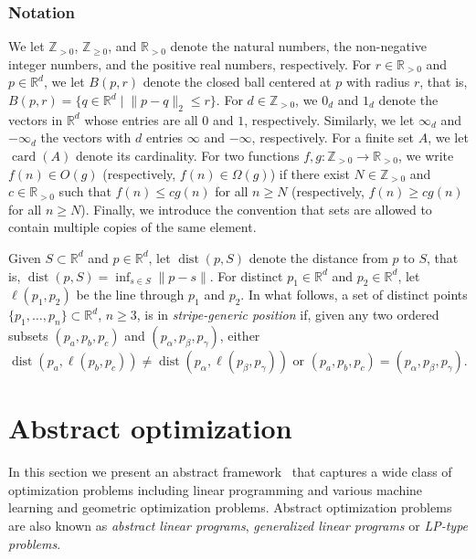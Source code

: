 \documentclass[onecolumn,journal,letterpaper]{IEEEtran}
\renewcommand{\natural}{{\mathbb{N}}}
\newcommand{\integernonnegative}{{\mathbb{Z}_{\geq0}}}
\renewcommand{\natural}{{\mathbb{Z}_{>0}}}
\newcommand{\naturalzero}{\mathbb{N}_0}
\renewcommand{\naturalzero}{\integernonnegative}
\newcommand{\real}{{\mathbb{R}}}
\newcommand{\setdef}[2]{\{#1 \; | \; #2\}}
\newcommand{\norm}[1]{\|#1\|}
\newcommand{\Enorm}[1]{\|#1\|_{2}}
\newcommand{\cball}[2]{B(#2,#1)}
\newcommand{\card}{\ensuremath{\operatorname{card}}}
\newcommand{\zeroRd}{{0}_{\real^d}}
\newcommand{\oneRd}{{1}_{\real^d}}
\renewcommand{\zeroRd}{{0}_d}
\renewcommand{\oneRd}{{1}_d}
\newcommand{\dist}{\operatorname{dist}}
\begin{document}
\subsubsection*{Notation}
We let $\natural$, $\naturalzero$, and $\real_{> 0}$ denote the natural
numbers, the non-negative integer numbers, and the positive real numbers,
respectively. For $r\in\real_{> 0}$ and $p\in\real^d$, we let
$\cball{r}{p}$ denote the closed ball centered at $p$ with radius $r$, that
is, $\cball{r}{p}=\setdef{q\in\real^d}{\Enorm{p-q}\leq{r}}$.  For
$d\in\natural$, we $\zeroRd$ and $\oneRd$ denote the vectors in $\real^d$
whose entries are all $0$ and $1$, respectively. Similarly, we let
$\infty_d$ and $-\infty_d$ the vectors with $d$ entries $\infty$ and
$-\infty$, respectively.  For a finite set $A$, we let $\card(A)$ denote
its cardinality.  For two functions $f,g:\natural\to\real_{> 0}$, we write
$f(n) \in O(g)$ (respectively, $f(n)\in\Omega(g)$) if there exist
$N\in\natural$ and $c\in\real_{>0}$ such that $f(n) \leq cg(n)$ for all $n
\geq N$ (respectively, $f(n) \geq cg(n)$ for all $n \geq N$).  Finally, we
introduce the convention that sets are allowed to contain multiple copies
of the same element.

Given $S\subset\real^d$ and $p\in\real^d$, let $\dist(p, S)$ denote the
distance from $p$ to $S$, that is, $\dist(p,S)=\inf_{s\in S}\norm{p-s}{}$.
For distinct $p_1\in\real^d$ and $p_2\in\real^d$, let $\ell(p_1,p_2)$ be
the line through $p_1$ and $p_2$.
In what follows, a set of distinct points
$\{p_1,\dots,p_n\}\subset\real^d$, $n\geq3$, is in \emph{stripe-generic
  position} if, given any two ordered subsets $(p_a,p_b,p_c)$ and
$(p_\alpha,p_\beta,p_\gamma)$, either $\dist(p_a, \ell(p_b,p_c)) \neq
\dist(p_\alpha, \ell(p_\beta,p_\gamma))$ or
$(p_a,p_b,p_c)=(p_\alpha,p_\beta,p_\gamma)$.


\section{Abstract optimization}
\label{sec:LP-type problems}
In this section we present an abstract framework~\cite{PKA-SS:01,BG-EW:01}
that captures a wide class of optimization problems including linear
programming and various machine learning and geometric optimization
problems. Abstract optimization problems are also known as \emph{abstract
  linear programs}, \emph{generalized linear programs} or \emph{LP-type
  problems}.
\end{document}
